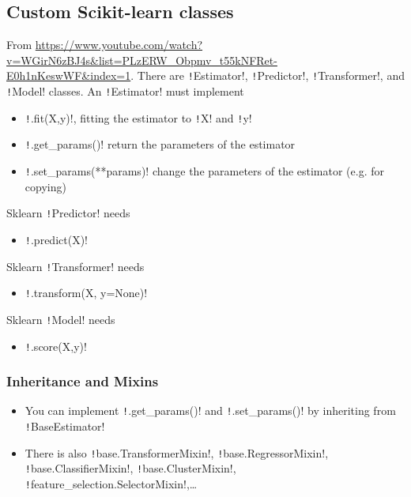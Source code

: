\documentclass[11pt]{article}
\theoremstyle{definition}
\begin{document}
\subsection{Custom Scikit-learn classes} From \url{https://www.youtube.com/watch?v=WGirN6zBJ4s&list=PLzERW_Obpmv_t55kNFRet-E0h1nKeswWF&index=1}. There are \texttt!Estimator!, \texttt!Predictor!, \texttt!Transformer!, and \texttt!Model! classes. An \texttt!Estimator! must implement 
\begin{itemize}
	\item \texttt!.fit(X,y)!, fitting the estimator to \texttt!X! and \texttt!y!
	\item \texttt!.get_params()! return the parameters of the estimator
	\item \texttt!.set_params(**params)! change the parameters of the estimator (e.g. for copying)
\end{itemize}
Sklearn \texttt!Predictor! needs 
\begin{itemize}
	\item \texttt!.predict(X)!
\end{itemize}
Sklearn \texttt!Transformer! needs 
\begin{itemize}
	\item \texttt!.transform(X, y=None)!
\end{itemize}
Sklearn \texttt!Model! needs 
\begin{itemize}
	\item \texttt!.score(X,y)!
\end{itemize}
\subsubsection{Inheritance and Mixins}
\begin{itemize}
	\item You can implement \texttt!.get_params()! and \texttt!.set_params()! by inheriting from \texttt!BaseEstimator!
	\item There is also \texttt!base.TransformerMixin!, \texttt!base.RegressorMixin!, \texttt!base.ClassifierMixin!,  \texttt!base.ClusterMixin!,  \texttt!feature_selection.SelectorMixin!,\dots
\end{itemize}
\end{document}

